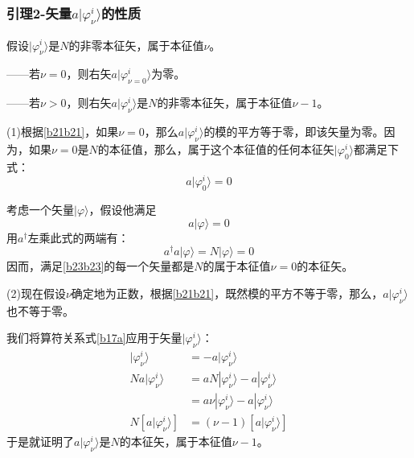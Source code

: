 \documentclass[]{article}
\begin{document}
\subsubsection{引理2-矢量$a|\varphi_\nu^i\rangle$的性质}
假设$|\varphi_\nu^i\rangle$是$N$的非零本征矢，属于本征值$\nu$。\par
——若$\nu=0$，则右矢$a|\varphi_{\nu=0}^i\rangle$为零。\par 
——若$\nu>0$，则右矢$a|\varphi_\nu^i\rangle$是$N$的非零本征矢，属于本征值$\nu-1$。\par 
(1)根据\eqref{b21b21}，如果$\nu=0$，那么$a|\varphi_\nu^i\rangle$的模的平方等于零，即该矢量为零。因为，如果$\nu=0$是$N$的本征值，那么，属于这个本征值的任何本征矢$|\varphi_0^i\rangle$都满足下式：
\begin{equation}
	a|\varphi_0^i\rangle=0
\end{equation}

考虑一个矢量$|\varphi\rangle$，假设他满足
\begin{equation}
	a|\varphi\rangle=0
	\label{b23b23}
\end{equation}
用$a^\dagger$左乘此式的两端有：
\begin{equation}
	a^\dagger a|\varphi\rangle=N|\varphi\rangle=0
\end{equation}
因而，满足\eqref{b23b23}的每一个矢量都是$N$的属于本征值$\nu=0$的本征矢。\par 
(2)现在假设$\nu$确定地为正数，根据\eqref{b21b21}，既然模的平方不等于零，那么，$a|\varphi_\nu^i\rangle$也不等于零。\par 
我们将算符关系式\eqref{b17a}应用于矢量$|\varphi_\nu^i\rangle$：
\begin{align}
	[N,a]|\varphi_\nu^i\rangle&=-a|\varphi_\nu^i\rangle\nonumber\\
	Na|\varphi_\nu^i\rangle&=aN|\varphi_\nu^i\rangle-a|\varphi_\nu^i\rangle\nonumber\\
	&=a\nu|\varphi_\nu^i\rangle-a|\varphi_\nu^i\rangle\nonumber\\
	N[a|\varphi_\nu^i\rangle]&=(\nu-1)[a|\varphi_\nu^i\rangle]
\end{align}
于是就证明了$a|\varphi_\nu^i\rangle$是$N$的本征矢，属于本征值$\nu-1$。
\end{document}
